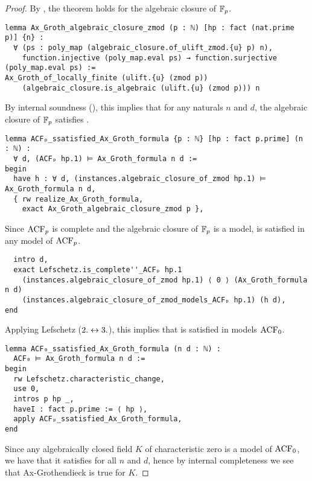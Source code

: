 \begin{proof}
By ,
the theorem holds for the algebraic closure of $\mathbb{F}_{p}$.
\begin{lstlisting}
lemma Ax_Groth_algebraic_closure_zmod (p : ℕ) [hp : fact (nat.prime p)] {n} :
  ∀ (ps : poly_map (algebraic_closure.of_ulift_zmod.{u} p) n),
    function.injective (poly_map.eval ps) → function.surjective (poly_map.eval ps) :=
Ax_Groth_of_locally_finite (ulift.{u} (zmod p))
    (algebraic_closure.is_algebraic (ulift.{u} (zmod p))) n \end{lstlisting}

By internal soundness (),
this implies that for any naturals $n$ and $d$,
the algebraic closure of $\mathbb{F}_{p}$ satisfies .

\begin{lstlisting}
lemma ACFₚ_ssatisfied_Ax_Groth_formula {p : ℕ} [hp : fact p.prime] (n : ℕ) :
  ∀ d, (ACFₚ hp.1) ⊨ Ax_Groth_formula n d :=
begin
  have h : ∀ d, (instances.algebraic_closure_of_zmod hp.1) ⊨ Ax_Groth_formula n d,
  { rw realize_Ax_Groth_formula,
    exact Ax_Groth_algebraic_closure_zmod p }, \end{lstlisting}

Since $\operatorname{ACF}_{p}$ is complete and the algebraic closure of $\mathbb{F}_{p}$ is a model,
 is satisfied in any model of $\operatorname{ACF}_{p}$.

\begin{lstlisting}
  intro d,
  exact Lefschetz.is_complete''_ACFₚ hp.1
    (instances.algebraic_closure_of_zmod hp.1) ⟨ 0 ⟩ (Ax_Groth_formula n d)
    (instances.algebraic_closure_of_zmod_models_ACFₚ hp.1) (h d),
end \end{lstlisting}

Applying Lefschetz ($2. \leftrightarrow 3.$), this implies that 
is satisfied in models $\operatorname{ACF}_{0}$.

\begin{lstlisting}
lemma ACF₀_ssatisfied_Ax_Groth_formula (n d : ℕ) :
  ACF₀ ⊨ Ax_Groth_formula n d :=
begin
  rw Lefschetz.characteristic_change,
  use 0,
  intros p hp _,
  haveI : fact p.prime := ⟨ hp ⟩,
  apply ACFₚ_ssatisfied_Ax_Groth_formula,
end \end{lstlisting}

Since any algebraically closed field $K$ of characteristic zero is a model of $\operatorname{ACF}_{0}$,
we have that it satisfies  for all $n$ and $d$,
hence by internal completeness we see that Ax-Grothendieck is true for $K$.


\end{proof}
